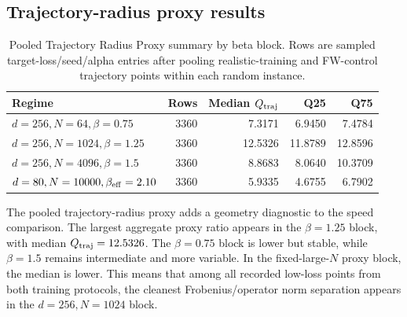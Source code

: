 \documentclass[11pt]{article}
\begin{document}
\subsection{Trajectory-radius proxy results}

\begin{table}[H]
\centering
\caption{Pooled Trajectory Radius Proxy summary by beta block. Rows are sampled target-loss/seed/alpha entries after pooling realistic-training and FW-control trajectory points within each random instance.}
\begin{tabular}{lrrrr}
\toprule
Regime & Rows & Median $Q_{\rm traj}$ & Q25 & Q75 \\
\midrule
$d=256,N=64,\beta=0.75$ & 3360 & 7.3171 & 6.9450 & 7.4784 \\
$d=256,N=1024,\beta=1.25$ & 3360 & 12.5326 & 11.8789 & 12.8596 \\
$d=256,N=4096,\beta=1.5$ & 3360 & 8.8683 & 8.0640 & 10.3709 \\
$d=80,N=10000,\beta_{\rm eff}=2.10$ & 3360 & 5.9335 & 4.6755 & 6.7902 \\
\bottomrule
\end{tabular}
\end{table}

The pooled trajectory-radius proxy adds a geometry diagnostic to the speed comparison. The largest aggregate proxy ratio appears in the $\beta=1.25$ block, with median $Q_{\rm traj}=12.5326$. The $\beta=0.75$ block is lower but stable, while $\beta=1.5$ remains intermediate and more variable. In the fixed-large-$N$ proxy block, the median is lower. This means that among all recorded low-loss points from both training protocols, the cleanest Frobenius/operator norm separation appears in the $d=256,N=1024$ block.
\end{document}
